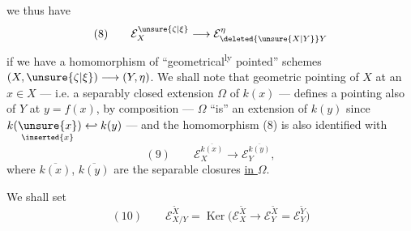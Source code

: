 
we thus have
\[
(8)\qquad \mathcal E_X^{\unsure{\zeta|\xi}}\longrightarrow\mathcal E_{\deleted{\unsure{X|Y}}Y}^\eta
\]
if we have a homomorphism of ``geometrical\textsuperscript{ly}
pointed'' schemes $(X,\unsure{\zeta|\xi})\longrightarrow(Y,\eta)$. We
shall note that  geometric pointing
of $X$ at an $x\in X$ --- i.e. a
separably closed extension $\Omega$ of $k(x)$ ---
defines  a  pointing also 
of $Y$ at $y=f(x)$,  by composition
--- $\Omega$ ``is'' an extension of $k(y)$ since
$k(\underset{\inserted{x}}{\unsure{x}})\hookleftarrow k(y)$ --- and the homomorphism (8)
is also identified with
\[
(9)\qquad \mathcal E_X^{\overline{k(x)}}\longrightarrow\mathcal E_Y^{\overline{k(y)}},
\]
where $\overline{k(x)}$, $\overline{k(y)}$ are the separable closures
\uline{in $\Omega$}.

We shall set
\[
(10)\qquad \mathcal E_{X/Y}^{\widetilde X}=\operatorname{Ker}\bigl(\mathcal E_X^{\widetilde X}\longrightarrow\mathcal E_Y^{\widetilde X}=\mathcal E_Y^{\widetilde Y}\bigr)
\]

